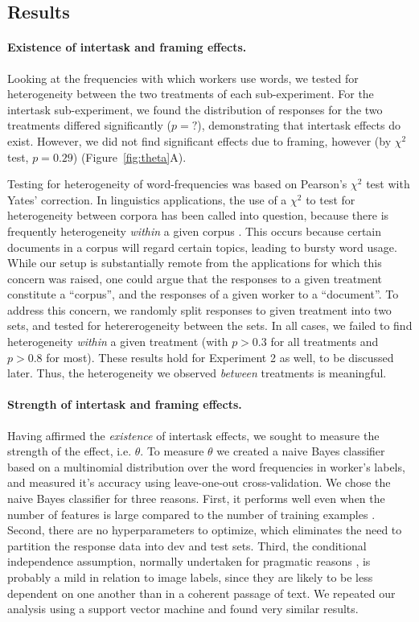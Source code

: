 \documentclass{sigchi}
\begin{document}
\subsection{Results}

\paragraph{Existence of intertask and framing effects.} 
Looking at the frequencies with which workers use words, we tested for
heterogeneity between the two treatments of each sub-experiment.
For the intertask sub-experiment, we found the distribution of responses 
for the two treatments differed significantly ($p=?$), 
demonstrating that intertask effects do exist.  However, we did not find 
significant effects due to framing, however (by $\chi^2$ test, $p=0.29$) 
(Figure~\ref{fig:theta}A).

Testing for heterogeneity of word-frequencies was based on 
Pearson's $\chi^2$ test with Yates' correction.
In linguistics applications, the use of a $\chi^2$ to test for 
heterogeneity between corpora has been called
into question, because there is frequently heterogeneity \textit{within}
a given corpus \cite{kilgarriff1996comparing}.
This occurs because certain documents in a corpus will regard certain 
topics, leading to bursty word usage.  While our setup is substantially
remote from the applications for which this concern was raised, 
one could argue that the responses to a given treatment
constitute a ``corpus'', and the responses of a given worker to a 
``document''.
To address this concern, we randomly split responses to given treatment
into two sets, and tested for hetererogeneity between the sets.
In all cases, we failed to find heterogeneity \textit{within} a given 
treatment (with $p > 0.3$ for all treatments and $p > 0.8$ for most).
These results hold for Experiment 2 as well, to be discussed later.
Thus, the heterogeneity we observed \textit{between} treatments is 
meaningful.

\paragraph{Strength of intertask and framing effects.}
Having affirmed the \textit{existence} of intertask effects, we sought to
measure the strength of the effect, i.e. $\theta$.
To measure $\theta$ we created a naive Bayes classifier based on a 
multinomial distribution over the word frequencies in worker's labels, 
and measured it's accuracy using leave-one-out cross-validation.  
We chose the naive Bayes
classifier for three reasons.  First, it performs well even when the 
number of features is large compared to the number of training examples
\cite{bickel2004,hastie2009elements}.  
Second, there are no hyperparameters to 
optimize, which eliminates the need to partition the response data into
dev and test sets.
Third, the conditional independence assumption, normally 
undertaken for pragmatic reasons \cite{Zhang2004562}, 
is probably a mild in 
relation to image labels, since they are likely to be less dependent
on one another than in a coherent passage of text.  We repeated our
analysis using a support vector machine and found very similar results.
\end{document}

